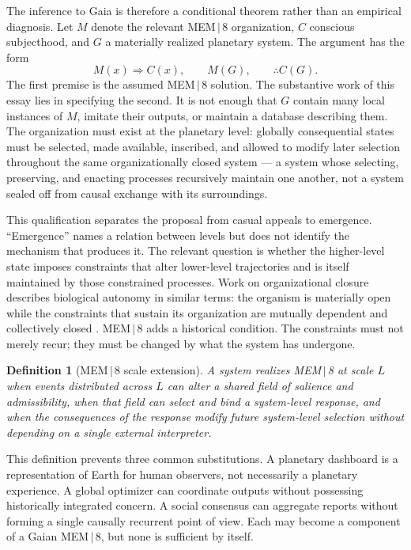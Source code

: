 \documentclass[11pt]{article}
\newtheorem{definition}{Definition}
\begin{document}
The inference to Gaia is therefore a conditional theorem rather than an empirical diagnosis. Let $M$ denote the relevant MEM\,$|$\,8 organization, $C$ conscious subjecthood, and $G$ a materially realized planetary system. The argument has the form
\[
M(x) \Rightarrow C(x), \qquad M(G), \qquad \therefore C(G).
\]
The first premise is the assumed MEM\,$|$\,8 solution. The substantive work of this essay lies in specifying the second. It is not enough that $G$ contain many local instances of $M$, imitate their outputs, or maintain a database describing them. The organization must exist at the planetary level: globally consequential states must be selected, made available, inscribed, and allowed to modify later selection throughout the same organizationally closed system --- a system whose selecting, preserving, and enacting processes recursively maintain one another, not a system sealed off from causal exchange with its surroundings.

This qualification separates the proposal from casual appeals to emergence. ``Emergence'' names a relation between levels but does not identify the mechanism that produces it. The relevant question is whether the higher-level state imposes constraints that alter lower-level trajectories and is itself maintained by those constrained processes. Work on organizational closure describes biological autonomy in similar terms: the organism is materially open while the constraints that sustain its organization are mutually dependent and collectively closed \cite{mossio2010,moreno2015}. MEM\,$|$\,8 adds a historical condition. The constraints must not merely recur; they must be changed by what the system has undergone.

\begin{definition}[MEM\,$|$\,8 scale extension]
A system realizes MEM\,$|$\,8 at scale $L$ when events distributed across $L$ can alter a shared field of salience and admissibility, when that field can select and bind a system-level response, and when the consequences of the response modify future system-level selection without depending on a single external interpreter.
\end{definition}

This definition prevents three common substitutions. A planetary dashboard is a representation of Earth for human observers, not necessarily a planetary experience. A global optimizer can coordinate outputs without possessing historically integrated concern. A social consensus can aggregate reports without forming a single causally recurrent point of view. Each may become a component of a Gaian MEM\,$|$\,8, but none is sufficient by itself.
\end{document}
